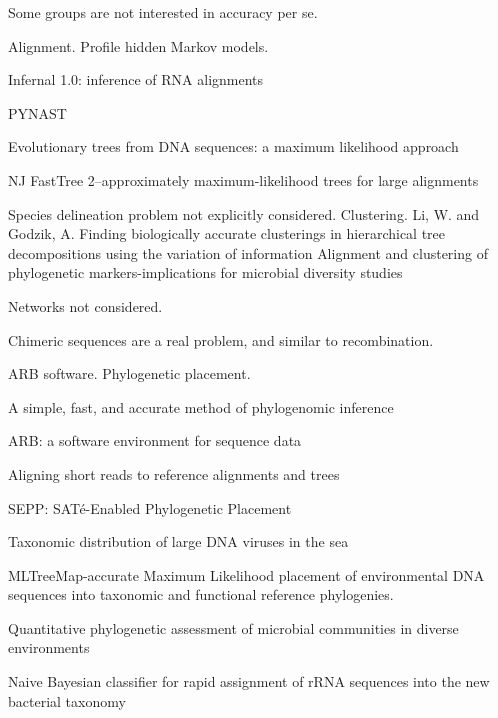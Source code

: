 \documentclass{amsart}
\begin{document}
Some groups are not interested in accuracy per se.

Alignment.
\cite{eddy1998profile}
Profile hidden Markov models.

\cite{nawrocki2009infernal}
Infernal 1.0: inference of RNA alignments

PYNAST


\cite{felsenstein1981evolutionary}
{Evolutionary trees from DNA sequences: a maximum likelihood approach}

NJ
\cite{price2010fasttree}
{FastTree 2--approximately maximum-likelihood trees for large alignments}

Species delineation problem not explicitly considered. Clustering.
\cite{li2006cdhit}
Li, W.  and Godzik, A.
\cite{edgar2010usearch}
\cite{navlakha2009finding} Finding biologically accurate clusterings in hierarchical tree decompositions using the variation of information
\cite{white2010alignment} Alignment and clustering of phylogenetic markers-implications for microbial diversity studies

Networks not considered.

Chimeric sequences are a real problem, and similar to recombination.

ARB software.
Phylogenetic placement.

\cite{wu2008simple}
A simple, fast, and accurate method of phylogenomic inference

\cite{matsen2010pplacer}

\cite{ludwig2004arb}
{{ARB}: a software environment for sequence data}
\cite{berger2011performance}

\cite{berger2011aligning}
Aligning short reads to reference alignments and trees

\cite{mirarabsepp}
{SEPP: SAT{\'e}-Enabled Phylogenetic Placement}

\cite{monierEaLargeViruses08}
{Taxonomic distribution of large DNA viruses in the sea}

\cite{stark2010mltreemap}
{{MLTreeMap}-accurate Maximum Likelihood placement of environmental DNA sequences into taxonomic and functional reference phylogenies.}

\cite{vonMeringEaQuantitative08}
{Quantitative phylogenetic assessment of microbial communities in diverse environments}


\cite{huson2007megan}

\cite{wang2007naive}
{Naive Bayesian classifier for rapid assignment of rRNA sequences into the new bacterial taxonomy}
\end{document}
